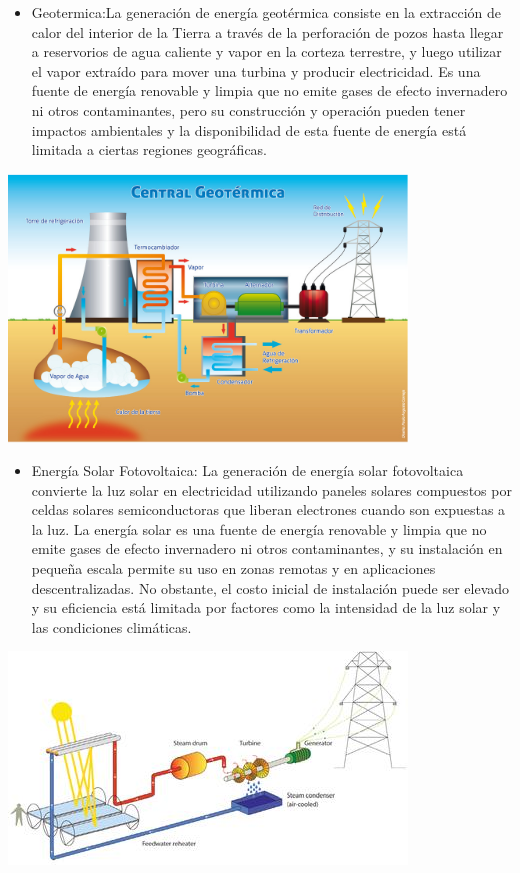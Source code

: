 \documentclass[
]{article}
\providecommand{\tightlist}{%
  \setlength{\itemsep}{0pt}\setlength{\parskip}{0pt}}
\begin{document}
\begin{itemize}
\tightlist
\item
  Geotermica:La generación de energía geotérmica consiste en la
  extracción de calor del interior de la Tierra a través de la
  perforación de pozos hasta llegar a reservorios de agua caliente y
  vapor en la corteza terrestre, y luego utilizar el vapor extraído para
  mover una turbina y producir electricidad. Es una fuente de energía
  renovable y limpia que no emite gases de efecto invernadero ni otros
  contaminantes, pero su construcción y operación pueden tener impactos
  ambientales y la disponibilidad de esta fuente de energía está
  limitada a ciertas regiones geográficas.
\end{itemize}

\includegraphics[width=4.16667in,height=\textheight]{geoter.jpeg}

\begin{itemize}
\tightlist
\item
  Energía Solar Fotovoltaica: La generación de energía solar
  fotovoltaica convierte la luz solar en electricidad utilizando paneles
  solares compuestos por celdas solares semiconductoras que liberan
  electrones cuando son expuestas a la luz. La energía solar es una
  fuente de energía renovable y limpia que no emite gases de efecto
  invernadero ni otros contaminantes, y su instalación en pequeña escala
  permite su uso en zonas remotas y en aplicaciones descentralizadas. No
  obstante, el costo inicial de instalación puede ser elevado y su
  eficiencia está limitada por factores como la intensidad de la luz
  solar y las condiciones climáticas.
\end{itemize}

\includegraphics[width=4.16667in,height=\textheight]{fotovol.jpeg}
\end{document}
